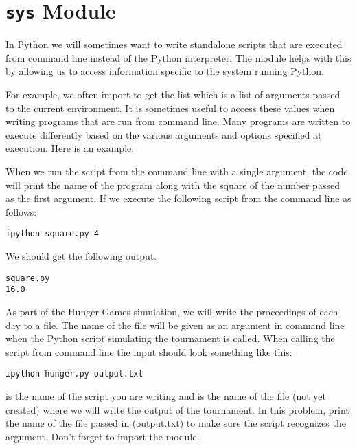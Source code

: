 \section*{\texttt{sys} Module}
In Python we will sometimes want to write standalone scripts that are executed from command line instead of the Python interpreter. The  module helps with this by allowing us to access information specific to the system running Python.

For example, we often import  to get the list  which is a list of arguments passed to the current environment.
It is sometimes useful to access these values when writing programs that are run from command line.
Many programs are written to execute differently based on the various arguments and options specified at execution.
Here is an example.


When we run the script from the command line with a single argument, the code will print the name of the program along with the square of the number passed as the first argument.
If we execute the following script from the command line as follows:
\begin{lstlisting}[style=ShellInput]
ipython square.py 4
\end{lstlisting}
We should get the following output.
\begin{lstlisting}[style=ShellOutput]
square.py
16.0
\end{lstlisting}

\begin{problem}
As part of the Hunger Games simulation, we will write the proceedings of each day to a file. The name of the file will be given as an argument in command line when the Python script simulating the tournament is called. When calling the script from command line the input should look something like this:

\begin{lstlisting}[style=ShellOutput]
ipython hunger.py output.txt
\end{lstlisting}

 is the name of the script you are writing and  is the name of the file (not yet created) where we will write the output of the tournament. In this problem, print the name of the file passed in (output.txt) to make sure the script recognizes the argument. Don't forget to import the  module.

\end{problem}


